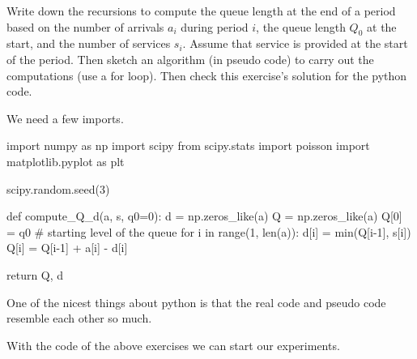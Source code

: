 \begin{exercise}
Write down the recursions to compute the queue length at the end of a period based on the number of arrivals $a_i$ during  period $i$, the queue length $Q_0$ at the start, and the number of services $s_i$. Assume that service is provided at the start of the period.   Then sketch an  algorithm (in pseudo code) to carry out the computations (use a for loop). Then check this exercise's solution for the python code.

  \begin{solution}
    We need a few imports.
\begin{pyverbatim}
import numpy as np
import scipy
from scipy.stats import poisson
import matplotlib.pyplot as plt

scipy.random.seed(3) 


def compute_Q_d(a, s, q0=0):
    d = np.zeros_like(a)
    Q = np.zeros_like(a)
    Q[0] = q0 # starting level of the queue
    for i in range(1, len(a)):
        d[i] = min(Q[i-1], s[i])
        Q[i] = Q[i-1] + a[i] - d[i]

    return Q, d
  
\end{pyverbatim}

    One of the nicest things about python is that  the real code and pseudo code resemble each other so much.
  \end{solution}
  
\end{exercise}


With the code of the above exercises we can start our experiments.

